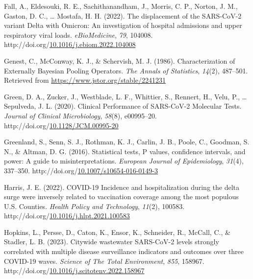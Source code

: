 \documentclass[12pt,twoside]{smiththesis}
\newlength{\cslhangindent}
\newenvironment{CSLReferences}[2] %
 {%
\setlength{\parindent}{0pt}
\ifodd #1 \everypar{\setlength{\hangindent}{\cslhangindent}}\ignorespaces\fi
\ifnum #2 > 0
\setlength{\parskip}{#2\baselineskip}
  \fi
}%
{}
\begin{document}
\begin{CSLReferences}{1}{0}
\leavevmode{}%
Fall, A., Eldesouki, R. E., Sachithanandham, J., Morris, C. P., Norton, J. M., Gaston, D. C., \ldots{} Mostafa, H. H. (2022). The displacement of the {SARS-CoV-2} variant {Delta} with {Omicron}: {An} investigation of hospital admissions and upper respiratory viral loads. \emph{eBioMedicine}, \emph{79}, 104008. http://doi.org/\href{https://doi.org/10.1016/j.ebiom.2022.104008}{10.1016/j.ebiom.2022.104008}

\leavevmode{}%
Genest, C., McConway, K. J., \& Schervish, M. J. (1986). Characterization of {Externally Bayesian Pooling Operators}. \emph{The Annals of Statistics}, \emph{14}(2), 487--501. Retrieved from \url{https://www.jstor.org/stable/2241231}

\leavevmode{}%
Green, D. A., Zucker, J., Westblade, L. F., Whittier, S., Rennert, H., Velu, P., \ldots{} Sepulveda, J. L. (2020). Clinical {Performance} of {SARS-CoV-2 Molecular Tests}. \emph{Journal of Clinical Microbiology}, \emph{58}(8), e00995--20. http://doi.org/\href{https://doi.org/10.1128/JCM.00995-20}{10.1128/JCM.00995-20}

\leavevmode{}%
Greenland, S., Senn, S. J., Rothman, K. J., Carlin, J. B., Poole, C., Goodman, S. N., \& Altman, D. G. (2016). Statistical tests, {P} values, confidence intervals, and power: A guide to misinterpretations. \emph{European Journal of Epidemiology}, \emph{31}(4), 337--350. http://doi.org/\href{https://doi.org/10.1007/s10654-016-0149-3}{10.1007/s10654-016-0149-3}

\leavevmode{}%
Harris, J. E. (2022). {COVID-19 Incidence} and hospitalization during the delta surge were inversely related to vaccination coverage among the most populous {U}.{S}. {Counties}. \emph{Health Policy and Technology}, \emph{11}(2), 100583. http://doi.org/\href{https://doi.org/10.1016/j.hlpt.2021.100583}{10.1016/j.hlpt.2021.100583}

\leavevmode{}%
Hopkins, L., Persse, D., Caton, K., Ensor, K., Schneider, R., McCall, C., \& Stadler, L. B. (2023). Citywide wastewater {SARS-CoV-2} levels strongly correlated with multiple disease surveillance indicators and outcomes over three {COVID-19} waves. \emph{Science of The Total Environment}, \emph{855}, 158967. http://doi.org/\href{https://doi.org/10.1016/j.scitotenv.2022.158967}{10.1016/j.scitotenv.2022.158967}


\end{CSLReferences}
\end{document}
